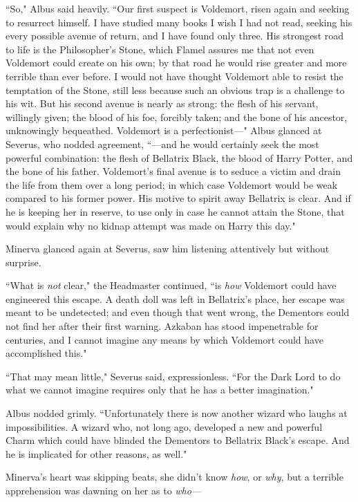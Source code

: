``So," Albus said heavily. ``Our first suspect is Voldemort, risen again and seeking to resurrect himself. I have studied many books I wish I had not read, seeking his every possible avenue of return, and I have found only three. His strongest road to life is the Philosopher's Stone, which Flamel assures me that not even Voldemort could create on his own; by that road he would rise greater and more terrible than ever before. I would not have thought Voldemort able to resist the temptation of the Stone, still less because such an obvious trap is a challenge to his wit. But his second avenue is nearly as strong: the flesh of his servant, willingly given; the blood of his foe, forcibly taken; and the bone of his ancestor, unknowingly bequeathed. Voldemort is a perfectionist---" Albus glanced at Severus, who nodded agreement, ``---and he would certainly seek the most powerful combination: the flesh of Bellatrix Black, the blood of Harry Potter, and the bone of his father. Voldemort's final avenue is to seduce a victim and drain the life from them over a long period; in which case Voldemort would be weak compared to his former power. His motive to spirit away Bellatrix is clear. And if he is keeping her in reserve, to use only in case he cannot attain the Stone, that would explain why no kidnap attempt was made on Harry this day."

Minerva glanced again at Severus, saw him listening attentively but without surprise.

``What is \emph{not} clear," the Headmaster continued, ``is \emph{how} Voldemort could have engineered this escape. A death doll was left in Bellatrix's place, her escape was meant to be undetected; and even though that went wrong, the Dementors could not find her after their first warning. Azkaban has stood impenetrable for centuries, and I cannot imagine any means by which Voldemort could have accomplished this."

``That may mean little," Severus said, expressionless. ``For the Dark Lord to do what we cannot imagine requires only that he has a better imagination."

Albus nodded grimly. ``Unfortunately there is now another wizard who laughs at impossibilities. A wizard who, not long ago, developed a new and powerful Charm which could have blinded the Dementors to Bellatrix Black's escape. And he is implicated for other reasons, as well."

Minerva's heart was skipping beats, she didn't know \emph{how}, or \emph{why}, but a terrible apprehension was dawning on her as to \emph{who---}

